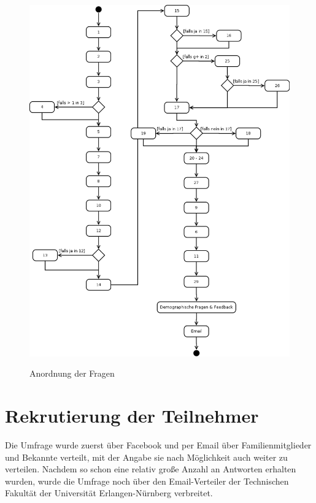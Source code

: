 \begin{figure}[H]
\centering
\includegraphics[height=\textheight]{images/umldia}\\
\caption{Anordnung der Fragen}\label{umldia}
\end{figure}


\section{Rekrutierung der Teilnehmer}
Die Umfrage wurde zuerst über Facebook und per Email über Familienmitglieder und Bekannte verteilt, mit der Angabe sie nach Möglichkeit auch weiter zu verteilen. Nachdem so schon eine relativ große Anzahl an Antworten erhalten wurden, wurde die Umfrage noch über den Email-Verteiler der Technischen Fakultät der Universität Erlangen-Nürnberg verbreitet.